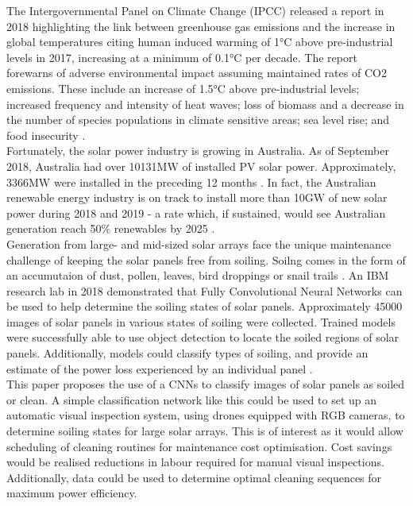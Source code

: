 \documentclass[10pt,journal,compsoc]{IEEEtran}
\begin{document}
		The Intergovernmental Panel on Climate Change (IPCC) released a report in 2018 highlighting the link between greenhouse gas emissions and the increase in global temperatures citing human induced warming of 1$\si{\celsius}$ above pre-industrial levels in 2017, increasing at a minimum of 0.1$ \si{\celsius}$ per decade. The report forewarns of adverse environmental impact assuming maintained rates of CO2 emissions. These include an increase of 1.5$ \si{\celsius}$ above pre-industrial levels; increased frequency and intensity of heat waves; loss of biomass and a decrease in the number of species populations in climate sensitive areas; sea level rise; and food insecurity \cite{IPCC:2018}.\\ 
		
		Fortunately, the solar power industry is growing in Australia. As of September 2018, Australia had over 10131$\si{\mega\watt}$ of installed PV solar power. Approximately, 3366$\si{\mega\watt}$ were installed in the preceding 12 months \cite{APVI:2018}. In fact, the Australian renewable energy industry is on track to install more than 10$\si{\giga\watt}$ of new solar power during 2018 and 2019 - a rate which, if sustained, would see Australian generation reach 50\% renewables by 2025 \cite{Baldwin:2018}.\\
		
		Generation from large- and mid-sized solar arrays face the unique maintenance challenge of keeping the solar panels free from soiling. Soilng comes in the form of an accumutaion of dust, pollen, leaves, bird droppings or snail trails \cite{Maghami:2016}. An IBM research lab in 2018 demonstrated that Fully Convolutional Neural Networks can be used to help determine the soiling states of solar panels. Approximately 45000 images of solar panels in various states of soiling were collected. Trained models were successfully able to use object detection to locate the soiled regions of solar panels. Additionally, models could classify types of soiling, and provide an estimate of the power loss experienced by an individual panel \cite{Mehta:2018}.\\
		
		This paper proposes the use of a CNNs to classify images of solar panels as soiled or clean. A simple classification network like this could be used to set up an automatic visual inspection system, using drones equipped with RGB cameras, to determine soiling states for large solar arrays. This is of interest as it would allow scheduling of cleaning routines for maintenance cost optimisation. Cost savings would be realised reductions in labour required for manual visual inspections. Additionally, data could be used to determine optimal cleaning sequences for maximum power efficiency.\\
		
\end{document}
